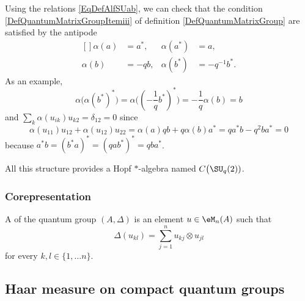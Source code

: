 Using the relations \eqref{EqDefAlfSUab}, we can check that the condition \ref{DefQuantumMatrixGroupItemiii} of definition \ref{DefQuantumMatrixGroup} are satisfied by the antipode
\begin{equation}
    \begin{aligned}[]
        \alpha(a)&=a^*,     &   \alpha(a^*)&=a,\\
        \alpha(b)&=-qb,     &   \alpha(b^*)&=-q^{-1}b^*.
    \end{aligned}
\end{equation}
As an example,
\begin{equation}
    \alpha\big( \alpha(b^*)^* \big)=\alpha\big( (-\frac{1}{ q }b^*)^* \big)=-\frac{1}{ q }\alpha(b)=b
\end{equation}
and $\sum_k\alpha(u_{ik})u_{k2}=\delta_{12}=0$ since
\begin{equation}
    \alpha(u_{11})u_{12}+\alpha(u_{12})u_{22}=\alpha(a)qb+q\alpha(b)a^*=qa^*b-q^2ba^*=0
\end{equation}
because $a^*b=(b^*a)^*=(qab^*)^*=qba^*$.

All this structure provides a Hopf $*$-algebra named $C\big(\SU_q(2))$.

\subsubsection{Corepresentation}

A  of the quantum group $(A,\Delta)$ is an element $u\in\eM_n(A)$ such that
\begin{equation}
    \Delta(u_{kl})=\sum_{j=1}^nu_{kj}\otimes u_{jl}
\end{equation}
for every $k,l\in\{ 1,\ldots n \}$.

\subsection{Haar measure on compact quantum groups}

